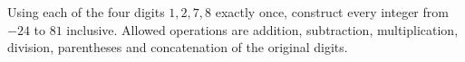 Using each of the four digits $1,2,7,8$ exactly once, construct every integer from $-24$ to $81$ inclusive. Allowed operations are addition, subtraction, multiplication, division, parentheses and concatenation of the original digits.
